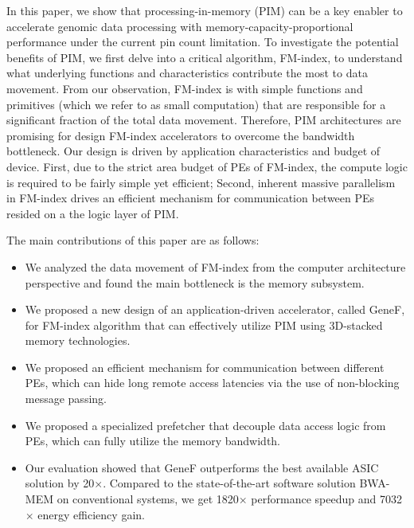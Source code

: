\documentclass[9pt,conference]{IEEEtran}
\begin{document}
In this paper, we show that processing-in-memory (PIM) can be a key enabler to accelerate genomic data processing with memory-capacity-proportional performance under the current pin count limitation. 
To investigate the potential benefits of PIM, we first delve into a critical algorithm, FM-index, to understand what underlying functions and characteristics contribute the most to data movement. From our observation, FM-index is with simple functions and primitives (which we refer to as small computation) that are responsible for a significant fraction of the total data movement. Therefore, PIM architectures are promising for design FM-index accelerators to overcome the bandwidth bottleneck. Our design is driven by application characteristics and budget of device. First, due to the strict area budget of PEs of FM-index, the compute logic is required to be fairly simple yet efficient; Second, inherent massive parallelism in FM-index drives an efficient mechanism for communication between PEs resided on a the logic layer of PIM. 

The main contributions of this paper are as follows:

\begin{itemize}

    \item We analyzed the data movement of FM-index from the computer architecture perspective and found the main bottleneck is the memory subsystem.
    
    \item We proposed a new design of an application-driven accelerator, called GeneF, for FM-index algorithm that can effectively utilize PIM using 3D-stacked memory technologies.
    
    \item We proposed an efficient mechanism for communication between different PEs, which can hide long remote access latencies via the use of non-blocking message passing.
    
    \item We proposed a specialized prefetcher that decouple data access logic from PEs, which can fully utilize the memory bandwidth.
    
    \item Our evaluation showed that GeneF outperforms the best available ASIC solution by 20$\times$. Compared to the state-of-the-art software solution BWA-MEM on conventional systems, we get 1820$\times$ performance speedup and 7032$\times$ energy efficiency gain.
    
\end{itemize}
\end{document}
